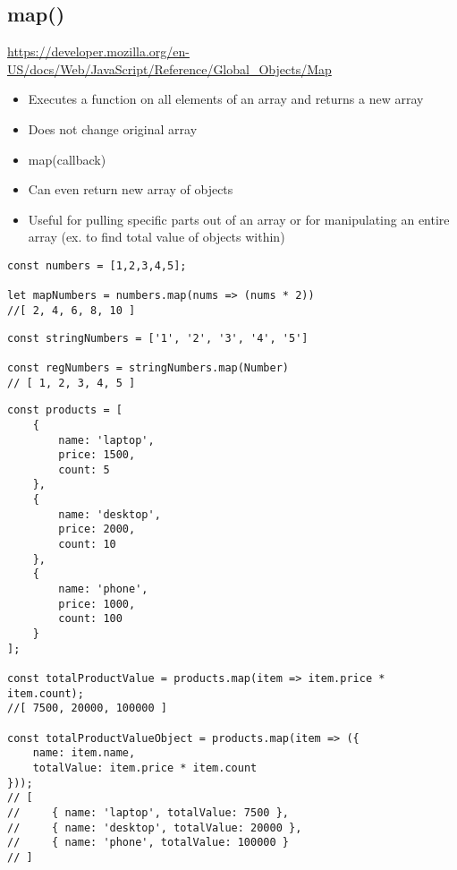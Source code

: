 \documentclass[10pt]{article}
\begin{document}
\medskip %
\pagebreak
\subsection{map()}

\url{https://developer.mozilla.org/en-US/docs/Web/JavaScript/Reference/Global_Objects/Map}

\begin{itemize}
	\item Executes a function on all elements of an array and returns a new array 
	\item Does not change original array
	\item map(callback)
	\item Can even return new array of objects
	\item Useful for pulling specific parts out of an array or for manipulating an entire array (ex. to find total value of objects within)
\end{itemize}

	
\begin{lstlisting}[title=Example simple map() multiplying all elements by two, captionpos=t]
const numbers = [1,2,3,4,5];

let mapNumbers = numbers.map(nums => (nums * 2))
//[ 2, 4, 6, 8, 10 ]
\end{lstlisting}

\begin{lstlisting}[title=Example map() Number constructor turning string numbers into regular integers, captionpos=t]
const stringNumbers = ['1', '2', '3', '4', '5']

const regNumbers = stringNumbers.map(Number)
// [ 1, 2, 3, 4, 5 ]
\end{lstlisting}

\begin{lstlisting}[title=Example simple map() to manipulate objects within array, captionpos=t]
const products = [
    {
        name: 'laptop',
        price: 1500,
        count: 5
    },
    {
        name: 'desktop',
        price: 2000,
        count: 10
    },
    {
        name: 'phone',
        price: 1000,
        count: 100
    }
];

const totalProductValue = products.map(item => item.price * item.count);
//[ 7500, 20000, 100000 ]

const totalProductValueObject = products.map(item => ({
    name: item.name,
    totalValue: item.price * item.count
}));
// [
//     { name: 'laptop', totalValue: 7500 },
//     { name: 'desktop', totalValue: 20000 },
//     { name: 'phone', totalValue: 100000 }
// ]
\end{lstlisting}
\medskip %
\end{document}
